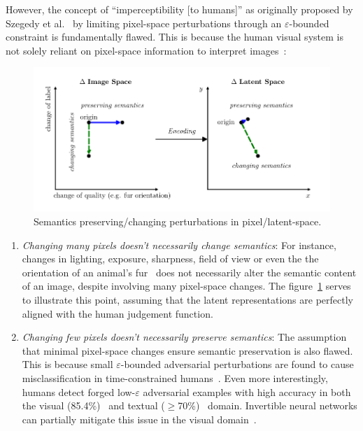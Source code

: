 \documentclass[a4paper, oneside]{discothesis}
\begin{document}
However, the concept of ``imperceptibility [to humans]'' as originally proposed by Szegedy et al.~\cite{szegedy2013intriguing} by limiting pixel-space perturbations through an $\varepsilon$-bounded constraint is fundamentally flawed. This is because the human visual system is not solely reliant on pixel-space information to interpret images~\cite{ ning2023hflic}:

\begin{figure}
    \centering
    \includegraphics[width=1\columnwidth]{figures/latentspace.pdf}
    \caption{Semantics preserving/changing perturbations in pixel/latent-space.}
    \label{fig:latentspace}
\end{figure}

\begin{enumerate}
	\item \textit{Changing many pixels doesn't necessarily change semantics}: For instance, changes in lighting, exposure, sharpness, field of view or even the the orientation of an animal's fur~\cite{kilcher2021dimpled} does not necessarily alter the semantic content of an image, despite involving many pixel-space changes. The figure~\ref{fig:latentspace} serves to illustrate this point, assuming that the latent representations are perfectly aligned with the human judgement function.

	\item \textit{Changing few pixels doesn't necessarily preserve semantics}: The assumption that minimal pixel-space changes ensure semantic preservation is also flawed. This is because small $\varepsilon$-bounded adversarial perturbations are found to cause misclassification in time-constrained humans~\cite{elsayed2018adversarial}. Even more interestingly, humans detect forged low-$\varepsilon$ adversarial examples with high accuracy in both the visual (85.4\%)~\cite{veerabadran2023subtle} and textual ($\geq$70\%)~\cite{herel2023preserving} domain. Invertible neural networks can partially mitigate this issue in the visual domain~\cite{chen2023imperceptible}.
\end{enumerate}
\end{document}
